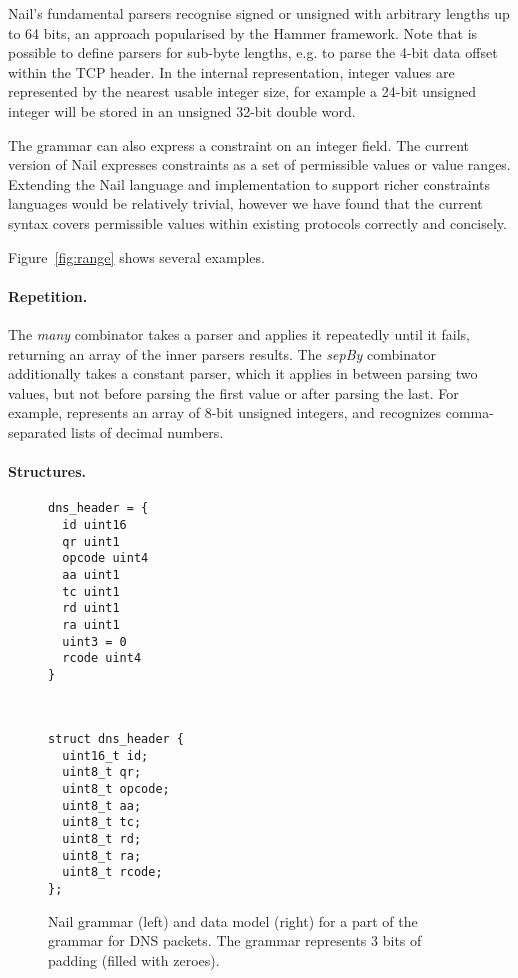 Nail's fundamental parsers recognise signed or unsigned with arbitrary lengths up to 64 bits, an
approach popularised by the Hammer framework.\cite{hammer-parser}  
Note that is possible to define parsers for sub-byte lengths, e.g. to parse the 4-bit
data offset within the TCP header.  In the internal representation, integer values are represented
by the nearest usable integer size, for example a 24-bit unsigned integer will be stored in an
unsigned 32-bit double word.

The grammar can also express a constraint on an integer field. The current version of Nail expresses
constraints as a set of permissible values or value ranges. Extending the Nail language and
implementation to support richer constraints languages would be relatively trivial, however we have
found that the current syntax covers permissible values within existing protocols correctly and
concisely.

Figure~\ref{fig:range} shows several examples.

\paragraph{Repetition.}

The \emph{many} combinator takes a parser and applies it repeatedly
until it fails, returning an array of the inner parsers results. The
\emph{sepBy} combinator
additionally takes a constant parser, which it applies in between parsing
two values, but not before parsing the first value or after parsing the
last.
For example,  represents an array of 8-bit unsigned
integers, and  recognizes
comma-separated lists of decimal numbers.

\paragraph{Structures.}

\begin{figure}[tb]
\smaller[0.5]
\begin{minipage}{0.45\columnwidth}
\begin{verbatim}
dns_header = {
  id uint16
  qr uint1
  opcode uint4
  aa uint1 
  tc uint1
  rd uint1
  ra uint1
  uint3 = 0
  rcode uint4
}
\end{verbatim} 
\end{minipage}
~
\begin{minipage}{0.45\columnwidth}
\begin{verbatim}
struct dns_header {
  uint16_t id;
  uint8_t qr;
  uint8_t opcode;
  uint8_t aa;
  uint8_t tc;
  uint8_t rd;
  uint8_t ra;
  uint8_t rcode;
};
\end{verbatim} 
\end{minipage}

\caption{Nail grammar (left) and data model (right) for a part of the
grammar for DNS packets.  The  grammar represents
3 bits of padding (filled with zeroes).}
\label{fig:dns-struct}
\end{figure}


